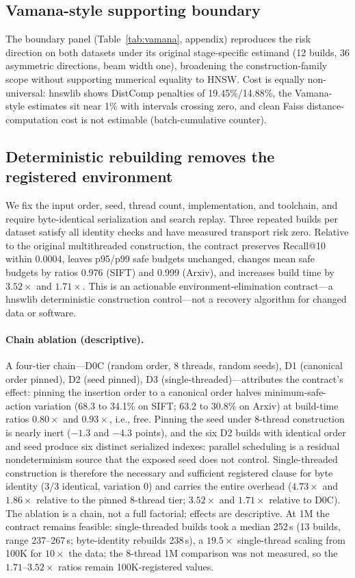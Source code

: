 \documentclass{article}
\begin{document}
\subsection{Vamana-style supporting boundary}

The boundary panel (Table~\ref{tab:vamana}, appendix) reproduces the risk direction on both datasets under
its original stage-specific estimand (12 builds, 36 asymmetric directions, beam width one), broadening the
construction-family scope without supporting numerical equality to HNSW. Cost is equally non-universal:
hnswlib shows DistComp penalties of 19.45\%/14.88\%, the Vamana-style estimates sit near 1\% with
intervals crossing zero, and clean Faiss distance-computation cost is not estimable (batch-cumulative
counter).

\subsection{Deterministic rebuilding removes the registered environment}
\label{sec:contract}

We fix the input order, seed, thread count, implementation, and toolchain, and require byte-identical
serialization and search replay. Three repeated builds per dataset satisfy all identity checks and have
measured transport risk zero. Relative to the original multithreaded construction, the contract preserves
Recall@10 within 0.0004, leaves p95/p99 safe budgets unchanged, changes mean safe budgets by ratios 0.976
(SIFT) and 0.999 (Arxiv), and increases build time by $3.52\times$ and $1.71\times$. This is an actionable
environment-elimination contract---a hnswlib deterministic construction control---not a recovery algorithm
for changed data or software.

\paragraph{Chain ablation (descriptive).}
A four-tier chain---D0C (random order, 8 threads, random seeds), D1 (canonical order pinned), D2 (seed
pinned), D3 (single-threaded)---attributes the contract's effect: pinning the insertion order to a
canonical order halves minimum-safe-action variation (68.3 to 34.1\% on SIFT; 63.2 to 30.8\% on Arxiv) at
build-time ratios $0.80\times$ and $0.93\times$, i.e., free. Pinning the seed under 8-thread construction is
nearly inert ($-1.3$ and $-4.3$ points), and the six D2 builds with identical order and seed produce six
distinct serialized indexes: parallel scheduling is a residual nondeterminism source that the exposed seed
does not control. Single-threaded construction is therefore the necessary and sufficient registered clause
for byte identity (3/3 identical, variation 0) and carries the entire overhead ($4.73\times$ and
$1.86\times$ relative to the pinned 8-thread tier; $3.52\times$ and $1.71\times$ relative to D0C). The
ablation is a chain, not a full factorial; effects are descriptive. At 1M the contract remains feasible:
single-threaded builds took a median 252\,s (13 builds, range 237--267\,s; byte-identity rebuilds 238\,s),
a $19.5\times$ single-thread scaling from 100K for $10\times$ the data; the 8-thread 1M comparison was
not measured, so the $1.71$--$3.52\times$ ratios remain 100K-registered values.
\end{document}
